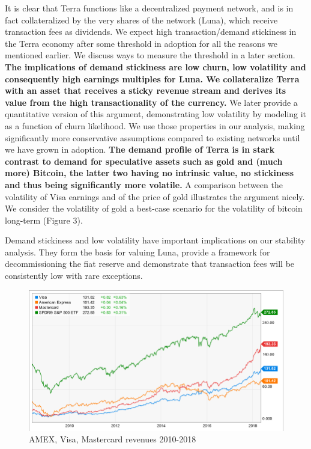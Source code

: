 \documentclass{article}
\begin{document}
It is clear that Terra functions like a decentralized payment network, and is in fact collateralized by the very shares of the network (Luna), which receive transaction fees as dividends. We expect high transaction/demand stickiness in the Terra economy after some threshold in adoption for all the reasons we mentioned earlier. We discuss ways to measure the threshold in a later section.  \textbf{The implications of demand stickiness are low churn, low volatility and consequently high earnings multiples for Luna. We collateralize Terra with an asset that receives a sticky revenue stream and derives its value from the high transactionality of the currency.} We later provide a quantitative version of this argument, demonstrating low volatility by modeling it as a function of churn likelihood. We use those properties in our analysis, making significantly more conservative assumptions compared to existing networks until we have grown in adoption. \textbf{The demand profile of Terra is in stark contrast to demand for speculative assets such as gold and (much more) Bitcoin, the latter two having no intrinsic value, no stickiness and thus being significantly more volatile.} A comparison between the volatility of Visa earnings and of the price of gold illustrates the argument nicely.  We consider the volatility of gold a best-case scenario for the volatility of bitcoin long-term (Figure 3).

Demand stickiness and low volatility have important implications on our stability analysis. They form the basis for valuing Luna, provide a framework for decommissioning the fiat reserve and demonstrate that transaction fees will be consistently low with rare exceptions.



\begin{figure}
	\centering
	\includegraphics[scale=0.35]{fig1.png}
	\caption[]
	{AMEX, Visa, Mastercard revenues 2010-2018}
\end{figure}
\end{document}
